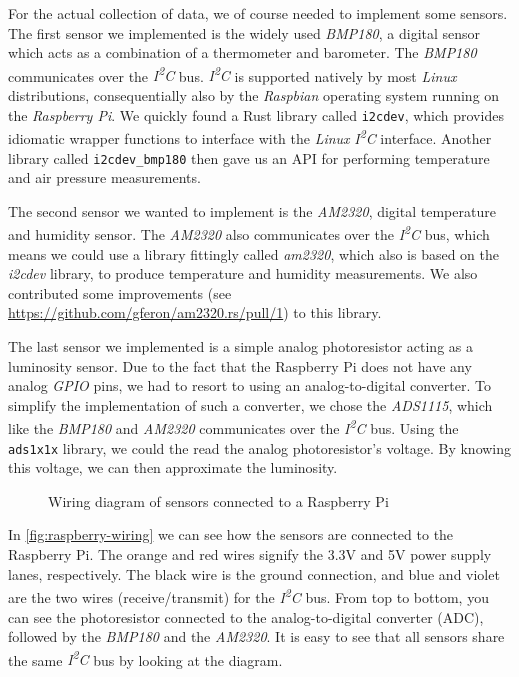 For the actual collection of data, we of course needed to implement some sensors. The first sensor
we implemented is the widely used \textit{BMP180}, a digital sensor which acts as a combination of a
thermometer and barometer. The \textit{BMP180} communicates over the \textit{I\textsuperscript{2}C}
bus. \textit{I\textsuperscript{2}C} is supported natively by most \textit{Linux} distributions,
consequentially also by the \textit{Raspbian} operating system running on the \textit{Raspberry Pi}.
We quickly found a Rust library called \texttt{i2cdev}, which provides idiomatic wrapper functions to
interface with the \textit{Linux} \textit{I\textsuperscript{2}C} interface. Another library called
\texttt{i2cdev\_bmp180} then gave us an API for performing temperature and air pressure measurements.

The second sensor we wanted to implement is the \textit{AM2320}, digital temperature and humidity
sensor. The \textit{AM2320} also communicates over the \textit{I\textsuperscript{2}C} bus, which
means we could use a library fittingly called \textit{am2320}, which also is based on the
\textit{i2cdev} library, to produce temperature and humidity measurements. We also contributed some
improvements (see \url{https://github.com/gferon/am2320.rs/pull/1}) to this library.

The last sensor we implemented is a simple analog photoresistor acting as a luminosity sensor. Due
to the fact that the Raspberry Pi does not have any analog \textit{GPIO} pins, we had to resort to
using an analog-to-digital converter. To simplify the implementation of such a converter, we chose
the \textit{ADS1115}, which like the \textit{BMP180} and \textit{AM2320} communicates over the
\textit{I\textsuperscript{2}C} bus. Using the \texttt{ads1x1x} library, we could the read the analog
photoresistor's voltage. By knowing this voltage, we can then approximate the luminosity.

\begin{figure}[H]
  \centering
  \caption{Wiring diagram of sensors connected to a Raspberry Pi}
  \label{fig:raspberry-wiring}
\end{figure}

In \autoref{fig:raspberry-wiring} we can see how the sensors are connected to the Raspberry Pi. The
orange and red wires signify the 3.3V and 5V power supply lanes, respectively. The black wire is the
ground connection, and blue and violet are the two wires (receive/transmit) for the
\textit{I\textsuperscript{2}C} bus. From top to bottom, you can see the photoresistor connected to
the analog-to-digital converter (ADC), followed by the \textit{BMP180} and the \textit{AM2320}. It
is easy to see that all sensors share the same \textit{I\textsuperscript{2}C} bus by looking at the
diagram.
